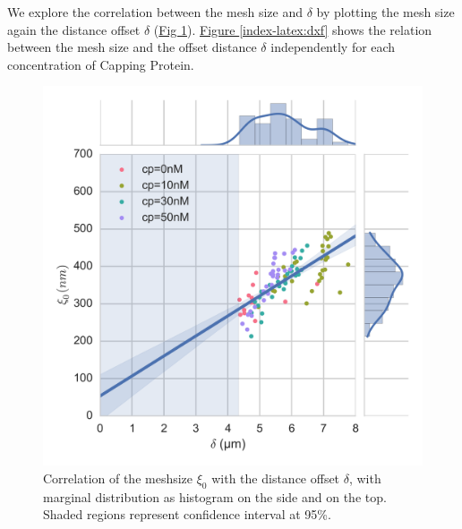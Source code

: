 \documentclass[A4paperpaper,11pt,english]{sphinxmanual}
\begin{document}
We explore the correlation between the mesh size and \(\delta\) by plotting  the mesh size again the distance offset \(\delta\) (\hyperref[index-latex:dxcf]{Fig  \ref*{index-latex:dxcf}}).
\hyperref[index-latex:dxf]{Figure  \ref*{index-latex:dxf}} shows the relation between the mesh size and the offset
distance \(\delta\) independently for each concentration of Capping Protein.
\begin{figure}[htbp]
\centering
\capstart

\includegraphics[width=1.000\linewidth]{delta-xi-corr.png}
\caption{Correlation of the meshsize \(\xi_0\) with the distance offset \(\delta\),
with marginal distribution as histogram on the side and on the top.  Shaded
regions represent confidence interval at 95\%.}\label{index-latex:dxcf}\end{figure}
\end{document}
